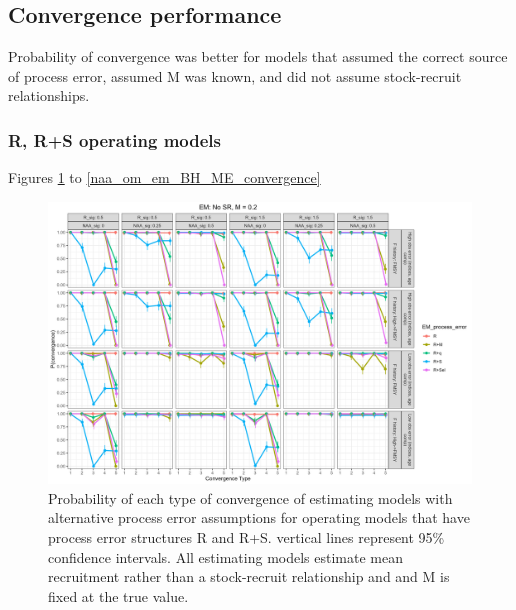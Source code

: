 \documentclass[
  12pt,
]{article}
\begin{document}
\hypertarget{convergence-performance}{%
\subsection*{Convergence performance}\label{convergence-performance}}

Probability of convergence was better for models that assumed the
correct source of process error, assumed M was known, and did not assume
stock-recruit relationships.

\hypertarget{r-rs-operating-models}{%
\subsubsection*{R, R+S operating models}\label{r-rs-operating-models}}

Figures \ref{naa_om_em_R_MF_convergence} to
\ref{naa_om_em_BH_ME_convergence}

\begin{landscape}
\begin{figure}
\caption{Probability of each type of convergence of estimating models with alternative process error assumptions for operating models that have process error structures R and R+S. vertical lines represent 95\% confidence intervals. All estimating models estimate mean recruitment rather than a stock-recruit relationship and and M is fixed at the true value.}\label{naa_om_em_R_MF_convergence}
\begin{center}
\includegraphics[width = \textwidth]{naa_om_p_convergence_meanR_M_fixed.png}
\end{center}
\end{figure}
\end{landscape}
\end{document}
